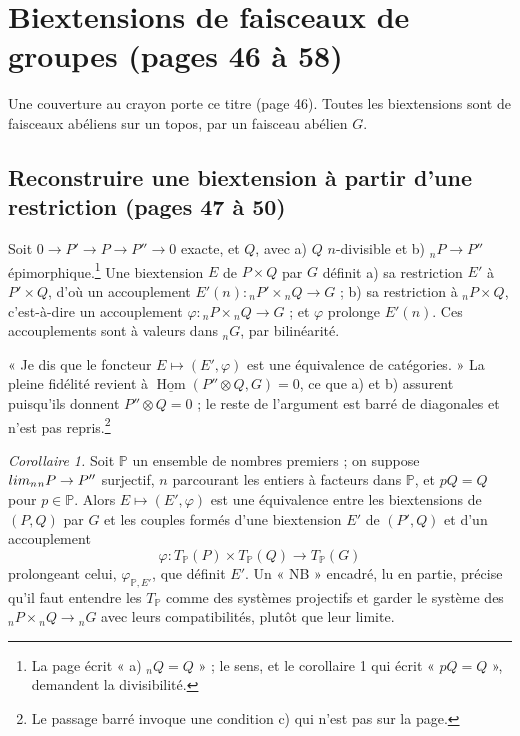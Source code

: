 \documentclass[11pt,a4paper]{article}
\begin{document}
\section*{Biextensions de faisceaux de groupes (pages 46 à 58)}

Une couverture au crayon porte ce titre (page 46). Toutes les biextensions sont
de faisceaux abéliens sur un topos, par un faisceau abélien $G$.

\subsection*{Reconstruire une biextension à partir d'une restriction (pages 47 à 50)}

Soit $0 \to P' \to P \to P'' \to 0$ exacte, et $Q$, avec a) $Q$ $n$-divisible et
b) ${}_nP \to P''$ épimorphique.\footnote{La page écrit « a) ${}_nQ = Q$ » ; le
sens, et le corollaire 1 qui écrit « $pQ = Q$ », demandent la divisibilité.} Une
biextension $E$ de $P \times Q$ par $G$ définit a) sa restriction $E'$ à
$P' \times Q$, d'où un accouplement $E'(n)\colon {}_nP' \times {}_nQ \to G$ ; b)
sa restriction à ${}_nP \times Q$, c'est-à-dire un accouplement $\varphi\colon
{}_nP \times {}_nQ \to G$ ; et $\varphi$ prolonge $E'(n)$. Ces accouplements sont
à valeurs dans ${}_nG$, par bilinéarité.

« Je dis que le foncteur $E \mapsto (E', \varphi)$ est une équivalence de
catégories. » La pleine fidélité revient à
$\underline{\operatorname{Hom}}(P'' \otimes Q, G) = 0$, ce que a) et b)
assurent puisqu'ils donnent $P'' \otimes Q = 0$ ; le reste de l'argument est
barré de diagonales et n'est pas repris.\footnote{Le passage barré invoque une
condition c) qui n'est pas sur la page.}

\emph{Corollaire 1.} Soit $\mathbb{P}$ un ensemble de nombres premiers ; on
suppose $\varinjlim_n {}_nP \to P''$ surjectif, $n$ parcourant les entiers à
facteurs dans $\mathbb{P}$, et $pQ = Q$ pour $p \in \mathbb{P}$. Alors $E
\mapsto (E', \varphi)$ est une équivalence entre les biextensions de $(P, Q)$
par $G$ et les couples formés d'une biextension $E'$ de $(P', Q)$ et d'un
accouplement
\[ \varphi\colon T_{\mathbb{P}}(P) \times T_{\mathbb{P}}(Q) \to
T_{\mathbb{P}}(G) \]
prolongeant celui, $\varphi_{\mathbb{P}, E'}$, que définit $E'$. Un « NB »
encadré, lu en partie, précise qu'il faut entendre les $T_{\mathbb{P}}$ comme
des systèmes projectifs et garder le système des ${}_nP \times {}_nQ \to {}_nG$
avec leurs compatibilités, plutôt que leur limite.
\end{document}
